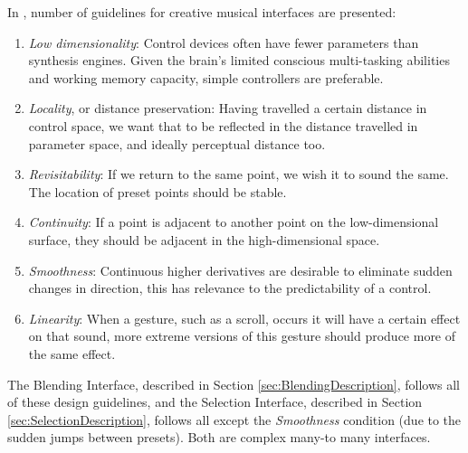\documentclass[11pt, oneside]{report}   	%
\begin{document}
In \cite{TubbThesis}, number of guidelines for creative musical interfaces are presented:
\begin{enumerate}
	\vspace{-10pt}
\setlength\itemsep{-1.2em}
	\item \emph{Low dimensionality}: Control devices often have fewer parameters than synthesis engines. Given the brain’s limited conscious multi-tasking abilities and working memory capacity, simple controllers are preferable.
	\item \emph{Locality}, or distance preservation: Having travelled a certain distance in control space, we want that to be reflected in the distance travelled in parameter space, and ideally perceptual distance too.
	\item \emph{Revisitability}: If we return to the same point, we wish it to sound the same. The location of preset points should be stable.
	\item \emph{Continuity}: If a point is adjacent to another point on the low-dimensional surface, they should be adjacent in the high-dimensional space.
	\item \emph{Smoothness}: Continuous higher derivatives are desirable to eliminate sudden changes in direction, this has relevance to the predictability of a control.
	\item \emph{Linearity}: When a gesture, such as a scroll, occurs it will have a certain effect on that sound, more extreme versions of this gesture should produce more of the same effect. %
	\vspace{-10pt}
\end{enumerate}
The Blending Interface, described in Section \ref{sec:BlendingDescription}, follows all of these design guidelines, and the Selection Interface, described in Section \ref{sec:SelectionDescription}, follows all except the \emph{Smoothness} condition (due to the sudden jumps between presets). Both are complex many-to many interfaces.
\end{document}
